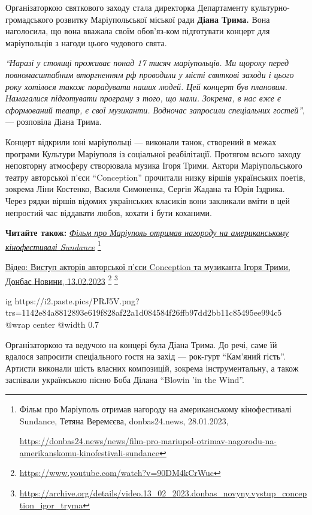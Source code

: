 Організаторкою святкового заходу стала директорка Департаменту
культурно-громадського розвитку Маріупольської міської ради \textbf{Діана Трима.} Вона
наголосила, що вона вважала своїм обов'яз\hyp{}ком підготувати концерт для
маріупольців з нагоди цього чудового свята.

\begin{leftbar}
\emph{\enquote{Наразі у столиці проживає понад 17 тисяч маріупольців. Ми щороку перед
повномасштабним вторгненням рф проводили у місті святкові заходи і
цього року хотілося також порадувати наших людей. Цей концерт був
плановим. Намагалися підготувати програму з того, що мали. Зокрема, в
нас вже є сформований театр, є свої музиканти. Водночас запросили
спеціальних гостей}}, — розповіла Діана Трима.
\end{leftbar}

Концерт відкрили юні маріупольці — виконали танок, створений в межах програми
Культури Маріуполя із соціальної реабілітації. Протягом всього заходу
неповторну атмосферу створювала музика Ігоря Трими. Актори Маріупольського
театру авторської п'єси \enquote{Conception} прочитали низку віршів українських поетів,
зокрема Ліни Костенко, Василя Симоненка, Сергія Жадана та Юрія Іздрика. Через
рядки віршів відомих українських класиків вони закликали вміти в цей непростий
час віддавати любов, кохати і бути коханими.

\textbf{Читайте також:} \href{https://donbas24.news/news/film-pro-mariupol-otrimav-nagorodu-na-amerikanskomu-kinofestivali-sundance}{\emph{Фільм про Маріуполь отримав нагороду на американському кінофестивалі Sundance}}%
\footnote{Фільм про Маріуполь отримав нагороду на американському кінофестивалі Sundance, Тетяна Веремєєва, donbas24.news, 28.01.2023, \par%
\url{https://donbas24.news/news/film-pro-mariupol-otrimav-nagorodu-na-amerikanskomu-kinofestivali-sundance}%
}

\href{https://archive.org/details/video.13_02_2023.donbas_novyny.vystup_conception_igor_tryma}{Відео: Виступ акторів авторської п'єси Conception та музиканта Ігоря Трими, Донбас Новини, 13.02.2023}%
\footnote{\url{https://www.youtube.com/watch?v=90DM4kCrWuc}} %
\footnote{\url{https://archive.org/details/video.13_02_2023.donbas_novyny.vystup_conception_igor_tryma}}

\ifcmt
  ig https://i2.paste.pics/PRJ5V.png?trs=1142e84a8812893e619f828af22a1d084584f26ffb97dd2bb11c85495ee994c5
  @wrap center
  @width 0.7
\fi

Організаторкою та ведучою на концері була Діана Трима. До речі, саме їй вдалося
запросити спеціального гостя на захід — рок-гурт \enquote{Кам'яний гість}. Артисти
виконали шість власних композицій, зокрема інструментальну, а також заспівали
українською пісню Боба Ділана \enquote{Blowin 'in the Wind}.

